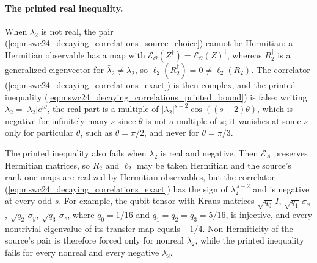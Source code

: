\documentclass{article}
\begin{document}
\paragraph{The printed real inequality.}
When $\lambda_2$ is not real, the pair
(\ref{eq:mswc24_decaying_correlations_source_choice}) cannot be Hermitian:
a Hermitian observable has a map with
$\mathcal E_{\mathcal O}(Z^\dagger)=\mathcal E_{\mathcal O}(Z)^\dagger$, whereas
$R_2^\dagger$ is a generalized eigenvector for $\bar\lambda_2\neq\lambda_2$, so
$\ell_2(R_2^\dagger)=0\neq\overline{\ell_2(R_2)}$. The correlator
(\ref{eq:mswc24_decaying_correlations_exact}) is then complex, and the printed
inequality (\ref{eq:mswc24_decaying_correlations_printed_bound}) is false:
writing $\lambda_2=\lvert\lambda_2\rvert e^{i\theta}$, the real part is a
multiple of $\lvert\lambda_2\rvert^{s-2}\cos((s-2)\theta)$, which is negative
for infinitely many $s$ since $\theta$ is not a multiple of $\pi$; it vanishes
at some $s$ only for particular $\theta$, such as $\theta=\pi/2$, and never
for $\theta=\pi/3$.

The printed inequality also fails when $\lambda_2$ is real and negative. Then
$\mathcal E_A$ preserves Hermitian matrices, so $R_2$ and $\ell_2$ may be
taken Hermitian and the source's rank-one maps are realized by Hermitian
observables, but the correlator (\ref{eq:mswc24_decaying_correlations_exact})
has the sign of $\lambda_2^{\,s-2}$ and is negative at every odd $s$. For
example, the qubit tensor with Kraus matrices $\sqrt{q_0}\,I$,
$\sqrt{q_1}\,\sigma_x$, $\sqrt{q_2}\,\sigma_y$, $\sqrt{q_3}\,\sigma_z$,
where $q_0=1/16$ and $q_1=q_2=q_3=5/16$, is injective, and every nontrivial
eigenvalue of its transfer map equals $-1/4$. Non-Hermiticity of the source's
pair is therefore forced only for nonreal $\lambda_2$, while the printed
inequality fails for every nonreal and every negative $\lambda_2$.
\end{document}

